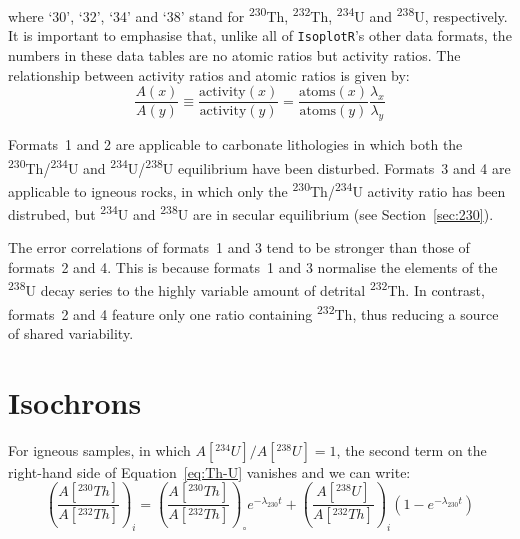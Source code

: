 \begin{refsection}
\noindent where `30', `32', `34' and `38' stand for
\textsuperscript{230}Th, \textsuperscript{232}Th,
\textsuperscript{234}U and \textsuperscript{238}U, respectively.  It
is important to emphasise that, unlike all of \texttt{IsoplotR}'s
other data formats, the numbers in these data tables are no atomic
ratios but activity ratios. The relationship between activity ratios
and atomic ratios is given by:
\begin{equation}
  \frac{A(x)}{A(y)} \equiv 
  \frac{\mbox{activity}(x)}{\mbox{activity}(y)} =
  \frac{\mbox{atoms}(x)}{\mbox{atoms}(y)}
  \frac{\lambda_{x}}{\lambda_{y}}
\end{equation}

Formats~1 and 2 are applicable to carbonate lithologies in which both
the \textsuperscript{230}Th/\textsuperscript{234}U and
\textsuperscript{234}U/\textsuperscript{238}U equilibrium have been
disturbed. Formats~3 and 4 are applicable to igneous rocks, in which
only the \textsuperscript{230}Th/\textsuperscript{234}U activity ratio
has been distrubed, but \textsuperscript{234}U and
\textsuperscript{238}U are in secular equilibrium (see
Section~\ref{sec:230}).

The error correlations of formats~1 and 3 tend to be stronger than
those of formats~2 and 4. This is because formats~1 and 3 normalise
the elements of the \textsuperscript{238}U decay series to the highly
variable amount of detrital \textsuperscript{232}Th. In contrast,
formats~2 and 4 feature only one ratio containing
\textsuperscript{232}Th, thus reducing a source of shared variability.

\section{Isochrons}

For igneous samples, in which $A[{}^{234}U]/A[{}^{238}U] = 1$, the
second term on the right-hand side of Equation~\ref{eq:Th-U} vanishes
and we can write:
\begin{equation}
  \left(\frac{A[{}^{230}Th]}{A[{}^{232}Th]}\right)_i = 
  \left(\frac{A[{}^{230}Th]}{A[{}^{232}Th]}\right)_{\!\circ}
  e^{-\lambda_{230}t} +
  \left(\frac{A[{}^{238}U]}{A[{}^{232}Th]}\right)_i
  \left(1-e^{-\lambda_{230}t}\right)
  \label{eq:rosholt}
\end{equation}


\end{refsection}
